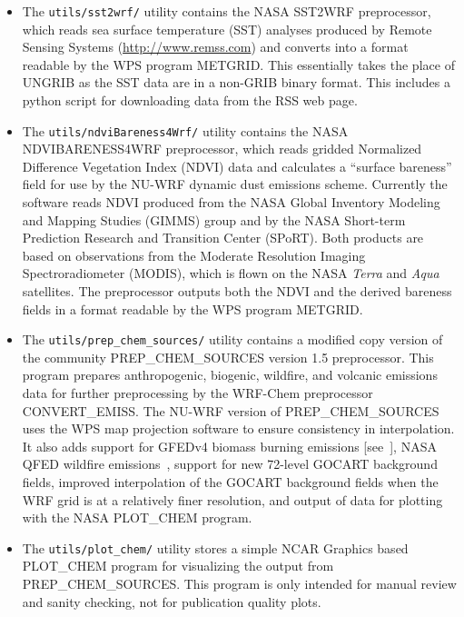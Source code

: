 \begin{itemize}
\item The \texttt{utils/sst2wrf/} utility contains the NASA SST2WRF 
  preprocessor, which reads sea surface temperature (SST) analyses produced by
  Remote Sensing Systems (\url{http://www.remss.com}) and converts into a 
  format readable by the WPS program METGRID. This essentially takes the place
  of UNGRIB as the SST data are in a non-GRIB binary format. This includes a
  python script for downloading data from the RSS web page.

\item The \texttt{utils/ndviBareness4Wrf/} utility contains the NASA\\ 
  NDVIBARENESS4WRF preprocessor, which reads gridded Normalized Difference
  Vegetation Index (NDVI) data and calculates a ``surface bareness'' field
  for use by the NU-WRF dynamic dust emissions scheme.  Currently the
  software reads NDVI produced from the NASA Global Inventory Modeling and
  Mapping Studies (GIMMS) group and by the NASA Short-term Prediction 
  Research and Transition Center (SPoRT).  Both products are based on
  observations from the Moderate Resolution Imaging Spectroradiometer (MODIS),
  which is flown on the NASA \textit{Terra} and \textit{Aqua} satellites.  The
  preprocessor outputs both the NDVI and the derived bareness fields in a 
  format readable by the WPS program METGRID.

\item The \texttt{utils/prep\_chem\_sources/} utility contains a modified
  copy version of the community PREP\_CHEM\_SOURCES version 1.5 
  preprocessor. This program prepares anthropogenic, biogenic, wildfire, and 
  volcanic emissions data for further preprocessing by the WRF-Chem 
  preprocessor CONVERT\_EMISS.  The NU-WRF version of PREP\_CHEM\_SOURCES
  uses the WPS map projection software to ensure consistency in interpolation.
  It also adds support for GFEDv4 biomass burning emissions [see~\citep{ref:RandersonEtAl2015}], 
  NASA QFED wildfire emissions~\citep{ref:QfedDocumentation}, support for new 72-level 
  GOCART background fields, improved interpolation of the GOCART background 
  fields when the WRF grid is at a relatively finer resolution, and output of 
  data for plotting with the NASA PLOT\_CHEM program.

\item The \texttt{utils/plot\_chem/} utility stores a simple NCAR Graphics
  based PLOT\_CHEM program for visualizing the output from PREP\_CHEM\_SOURCES.
  This program is only intended for manual review and sanity checking, not
  for publication quality plots.


\end{itemize}
